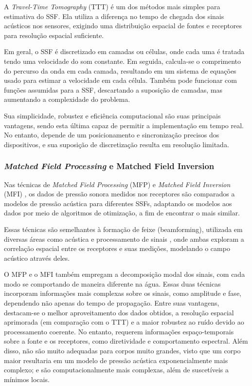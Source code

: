 A \textit{Travel-Time Tomography} (TTT) \cite{bormann_seismic_2012,stefanov_travel_2019} é um dos métodos mais simples para estimativa do SSF. Ela utiliza a diferença no tempo de chegada dos sinais acústicos nos sensores, exigindo uma distribuição espacial de fontes e receptores para resolução espacial suficiente.

Em geral, o SSF é discretizado em camadas ou células, onde cada uma é tratada tendo uma velocidade do som constante. Em seguida, calcula-se o comprimento do percurso da onda em cada camada, resultando em um sistema de equações usado para estimar a velocidade em cada célula. Também pode funcionar com funções assumidas para a SSF, descartando a suposição de camadas, mas aumentando a complexidade do problema.

Sua simplicidade, robustez e eficiência computacional são suas principais vantagens, sendo esta última capaz de permitir a implementação em tempo real. No entanto, depende de um posicionamento e sincronização precisos dos dispositivos, e sua suposição de discretização resulta em resolução limitada.

\subsubsection{\textit{Matched Field Processing} e {Matched Field Inversion}}
Nas técnicas de \textit{Matched Field Processing} (MFP) \cite{gemba_adaptive_2017} e \textit{Matched Field Inversion} (MFI) \cite{dosso_bayesian_2011}, os dados de pressão sonora medidos nos receptores são comparados a modelos de pressão acústica para diferentes SSFs, adaptando os modelos aos dados por meio de algoritmos de otimização, a fim de encontrar o mais similar.

Essas técnicas são semelhantes à formação de feixe (beamforming), utilizada em diversas áreas como acústica e processamento de sinais \cite{schmidt_environmentally_1990,brienzo_broadband_1993}, onde ambas exploram a correlação espacial entre os receptores e suas medições, modelando o campo acústico através deles.

O MFP e o MFI também empregam a decomposição modal dos sinais, com cada modo se comportando de maneira diferente na água. Essas duas técnicas incorporam informações mais complexas sobre os sinais, como amplitude e fase, dependendo não apenas do tempo de propagação. Entre suas vantagens, destacam-se o melhor aproveitamento dos dados obtidos, a resolução espacial aprimorada (em comparação com o TTT) e a maior robustez ao ruído devido ao processamento coerente. No entanto, requerem informações espaço-temporais sobre a fonte e os receptores, como diretividade e comportamento espectral. Além disso, não são muito adequadas para corpos muito grandes, visto que um corpo maior resultaria em um modelo de pressão acústica exponencialmente mais complexo; e são computacionalmente mais complexas, além de suscetíveis a mínimos locais.

